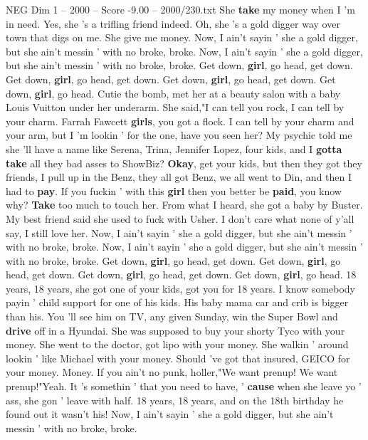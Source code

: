 \begin{textsample}{NEG Dim 1 – 2000 – Score -9.00 – 2000/230.txt}  \label{ex:f1_neg_012}
She \textbf{take} my money when I 'm in need.
Yes, she 's a trifling friend indeed.
Oh, she 's a gold digger way over town that digs on me.
She give me money.
Now, I ain't sayin ' she a gold digger, but she ain't messin ' with no broke, broke.
Now, I ain't sayin ' she a gold digger, but she ain't messin ' with no broke, broke.
Get down, \textbf{girl}, go head, get down.
Get down, \textbf{girl}, go head, get down.
Get down, \textbf{girl}, go head, get down.
Get down, \textbf{girl}, go head.
Cutie the bomb, met her at a beauty salon with a baby Louis Vuitton under her underarm.
She said,"I can tell you rock, I can tell by your charm.
Farrah Fawcett \textbf{girls}, you got a flock.
I can tell by your charm and your arm, but I 'm lookin ' for the one, have you seen her?
My psychic told me she 'll have a name like Serena, Trina, Jennifer Lopez, four kids, and I \textbf{gotta} \textbf{take} all they bad asses to ShowBiz? \textbf{Okay}, get your kids, but then they got they friends, I pull up in the Benz, they all got Benz, we all went to Din, and then I had to \textbf{pay}.
If you fuckin ' with this \textbf{girl} then you better be \textbf{paid}, you know why? \textbf{Take} too much to touch her.
From what I heard, she got a baby by Buster.
My best friend said she used to fuck with Usher.
I don't care what none of y'all say, I still love her.
Now, I ain't sayin ' she a gold digger, but she ain't messin ' with no broke, broke.
Now, I ain't sayin ' she a gold digger, but she ain't messin ' with no broke, broke.
Get down, \textbf{girl}, go head, get down.
Get down, \textbf{girl}, go head, get down.
Get down, \textbf{girl}, go head, get down.
Get down, \textbf{girl}, go head. 18 years, 18 years, she got one of your kids, got you for 18 years.
I know somebody payin ' child support for one of his kids.
His baby mama car and crib is bigger than his.
You 'll see him on TV, any given Sunday, win the Super Bowl and \textbf{drive} off in a Hyundai.
She was supposed to buy your shorty Tyco with your money.
She went to the doctor, got lipo with your money.
She walkin ' around lookin ' like Michael with your money.
Should 've got that insured, GEICO for your money.
Money.
If you ain't no punk, holler,"We want prenup!
We want prenup!"Yeah.
It 's somethin ' that you need to have, ' \textbf{cause} when she leave yo ' ass, she gon ' leave with half. 18 years, 18 years, and on the 18th birthday he found out it wasn't his!
Now, I ain't sayin ' she a gold digger, but she ain't messin ' with no broke, broke.

\end{textsample}
